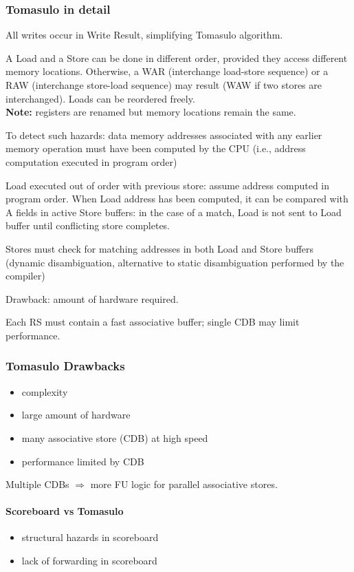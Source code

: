 \subsubsection{Tomasulo in detail}
All writes occur in Write Result, simplifying
Tomasulo algorithm.

A Load and a Store can be done in different
order, provided they access different memory
locations.
Otherwise, a WAR (interchange load-store
sequence) or a RAW (interchange store-load
sequence) may result (WAW if two stores are
interchanged).
Loads can be reordered freely.\\
\textbf{Note:} registers are renamed but memory locations remain the same.

To detect such hazards: data memory
addresses associated with any earlier memory
operation must have been computed by the
CPU (i.e., address computation executed in
program order)

Load executed out of order with previous store:
assume address computed in program order.
When Load address has been computed, it
can be compared with A fields in active Store
buffers: in the case of a match, Load is not sent
to Load buffer until conflicting store completes.

Stores must check for matching addresses in
both Load and Store buffers (dynamic
disambiguation, alternative to static
disambiguation performed by the compiler)

Drawback: amount of hardware required.

Each RS must contain a fast associative buffer;
single CDB may limit performance.

\subsubsection{Tomasulo Drawbacks}
\begin{itemize}
    \item complexity
    \item large amount of hardware
    \item many associative store (CDB) at high speed
    \item performance limited by CDB
\end{itemize}
Multiple CDBs $\Longrightarrow$ more FU logic for parallel associative
stores.

\paragraph{Scoreboard vs Tomasulo}
\begin{itemize}
    \item[\textrightarrow] structural hazards in scoreboard
    \item[\textrightarrow] lack of forwarding in scoreboard
\end{itemize}
